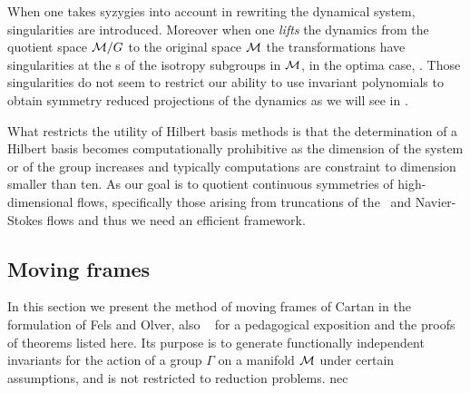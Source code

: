 When one takes syzygies into account in rewriting the dynamical
system, singularities are introduced. Moreover when one
\emph{lifts} the dynamics from the quotient space $\mathcal{M}/G$ to
the original space $\mathcal{M}$ the transformations have
singularities at the \fixedsp s of the isotropy subgroups in
$\mathcal{M}$, in the optima case, \cf {}. Those
singularities do not seem to restrict our ability to use
invariant polynomials to obtain symmetry reduced projections of
the dynamics as we will see in .

What restricts the utility of Hilbert basis methods is that the
determination of a Hilbert basis becomes computationally
prohibitive as the dimension of the system or of the group
increases and typically
computations are constraint to dimension smaller than ten. As
our goal is to quotient continuous symmetries of
high-dimensional flows, specifically those arising from
truncations of the \KS\ and Navier-Stokes flows
and thus we need an efficient framework.


\subsection{Moving frames}
\label{sec:mf}

In this section we present the method of moving frames
of Cartan in the formulation of Fels and Olver, also \cf~ for
a pedagogical exposition and the proofs of theorems listed here. Its purpose is to generate functionally
independent invariants for the action of a group $\Gamma$ on a manifold $\mathcal{M}$ under certain assumptions,
and is not restricted to reduction problems. 
nec

